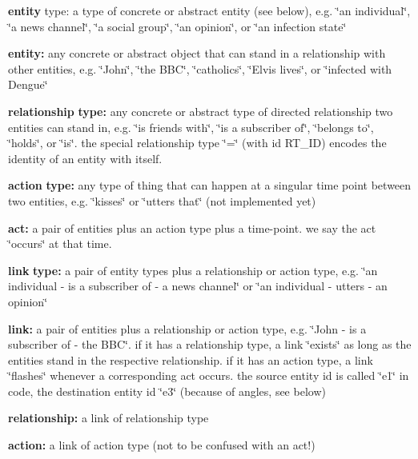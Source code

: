 \begin{DoxyItemize}
\item {\bfseries entity} type\+: a type of concrete or abstract entity (see below), e.\+g. \char`\"{}an individual\char`\"{}, \char`\"{}a news channel\char`\"{}, \char`\"{}a social group\char`\"{}, \char`\"{}an opinion\char`\"{}, or \char`\"{}an infection state\char`\"{}
\item {\bfseries entity\+:} any concrete or abstract object that can stand in a relationship with other entities, e.\+g. \char`\"{}\+John\char`\"{}, \char`\"{}the B\+B\+C\char`\"{}, \char`\"{}catholics\char`\"{}, \char`\"{}\+Elvis lives\char`\"{}, or \char`\"{}infected with Dengue\char`\"{}
\item {\bfseries relationship} {\bfseries type\+:} any concrete or abstract type of directed relationship two entities can stand in, e.\+g. \char`\"{}is friends with\char`\"{}, \char`\"{}is a subscriber of\char`\"{}, \char`\"{}belongs to\char`\"{}, \char`\"{}holds\char`\"{}, or \char`\"{}is\char`\"{}. the special relationship type \char`\"{}=\char`\"{} (with id R\+T\+\_\+\+ID) encodes the identity of an entity with itself.
\item {\bfseries action} {\bfseries type\+:} any type of thing that can happen at a singular time point between two entities, e.\+g. \char`\"{}kisses\char`\"{} or \char`\"{}utters that\char`\"{} (not implemented yet)
\item {\bfseries act\+:} a pair of entities plus an action type plus a time-\/point. we say the act \char`\"{}occurs\char`\"{} at that time.
\item {\bfseries link} {\bfseries type\+:} a pair of entity types plus a relationship or action type, e.\+g. \char`\"{}an individual -\/ is a subscriber of -\/ a news channel\char`\"{} or \char`\"{}an individual -\/ utters -\/ an opinion\char`\"{}
\item {\bfseries link\+:} a pair of entities plus a relationship or action type, e.\+g. \char`\"{}\+John -\/ is a subscriber of -\/ the B\+B\+C\char`\"{}. if it has a relationship type, a link \char`\"{}exists\char`\"{} as long as the entities stand in the respective relationship. if it has an action type, a link \char`\"{}flashes\char`\"{} whenever a corresponding act occurs. the source entity id is called \char`\"{}e1\char`\"{} in code, the destination entity id \char`\"{}e3\char`\"{} (because of angles, see below)
\item {\bfseries relationship\+:} a link of relationship type
\item {\bfseries action\+:} a link of action type (not to be confused with an act!)

\end{DoxyItemize}
